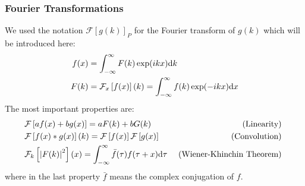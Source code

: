 \subsubsection{Fourier Transformations}
We used the notation  $\mathcal{F} \left[g(k)\right ]_P$ for the Fourier transform 
of $g(k)$ which will be introduced here:
\begin{align}
f(x) &= \int_{-\infty}^{\infty} F(k)\exp(i kx)\mathrm{d} k\\
F(k) &= \mathcal{F}_x\left [f(x)\right ](k) =
\int_{-\infty}^{\infty} f(k)\exp(-i kx) \mathrm{d} x
\end{align}
The most important properties are:
\begin{align}
    \label{eq:fourier}
&\mathcal{F}\left [a f(x) + b g(x)\right ]
    = a F(k) + b G(k) 
    &\mbox{ (Linearity) }\\
&\mathcal{F}\left [f(x) * g(x)\right ](k)
    = \mathcal{F}\left [f(x)\right ]\mathcal{F}\left [g(x)\right ]
    \! &\mbox{ (Convolution) }\\
&\mathcal{F}_k\left [\left | F(k) \right |^2\right ](x)
   =  \int_{-\infty}^{\infty}\bar{f}(\tau)f(\tau + x) \mathrm{d}\tau 
   &\mbox{ (Wiener-Khinchin Theorem) }
\end{align}
where in the last property $\bar{f}$ means the complex conjugation of $f$.

